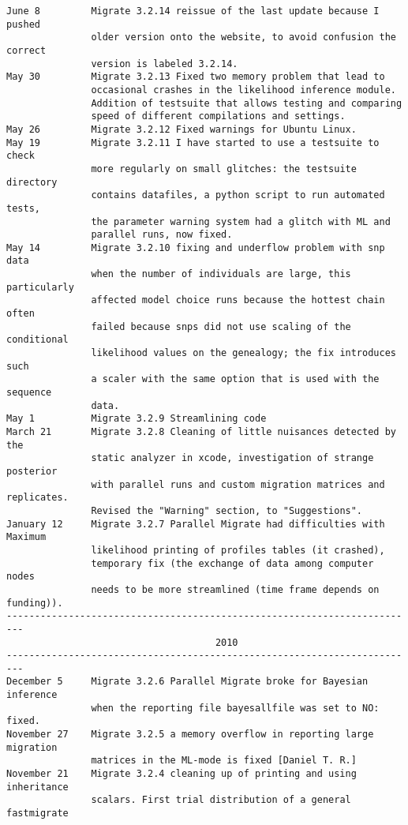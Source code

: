 \begin{small}
\begin{verbatim}
June 8         Migrate 3.2.14 reissue of the last update because I pushed
               older version onto the website, to avoid confusion the correct
               version is labeled 3.2.14.
May 30         Migrate 3.2.13 Fixed two memory problem that lead to 
               occasional crashes in the likelihood inference module.
               Addition of testsuite that allows testing and comparing
               speed of different compilations and settings.
May 26         Migrate 3.2.12 Fixed warnings for Ubuntu Linux.
May 19         Migrate 3.2.11 I have started to use a testsuite to check 
               more regularly on small glitches: the testsuite directory 
               contains datafiles, a python script to run automated tests,
               the parameter warning system had a glitch with ML and 
               parallel runs, now fixed.  
May 14         Migrate 3.2.10 fixing and underflow problem with snp data 
               when the number of individuals are large, this particularly
               affected model choice runs because the hottest chain often
               failed because snps did not use scaling of the conditional
               likelihood values on the genealogy; the fix introduces such 
               a scaler with the same option that is used with the sequence 
               data.
May 1          Migrate 3.2.9 Streamlining code
March 21       Migrate 3.2.8 Cleaning of little nuisances detected by the 
               static analyzer in xcode, investigation of strange posterior
               with parallel runs and custom migration matrices and replicates.
               Revised the "Warning" section, to "Suggestions". 
January 12     Migrate 3.2.7 Parallel Migrate had difficulties with Maximum
               likelihood printing of profiles tables (it crashed),
               temporary fix (the exchange of data among computer nodes 
               needs to be more streamlined (time frame depends on funding)).
-------------------------------------------------------------------------
                                     2010
-------------------------------------------------------------------------
December 5     Migrate 3.2.6 Parallel Migrate broke for Bayesian inference
               when the reporting file bayesallfile was set to NO: fixed.
November 27    Migrate 3.2.5 a memory overflow in reporting large migration
               matrices in the ML-mode is fixed [Daniel T. R.]
November 21    Migrate 3.2.4 cleaning up of printing and using inheritance 
               scalars. First trial distribution of a general fastmigrate

\end{verbatim}
\end{small}
